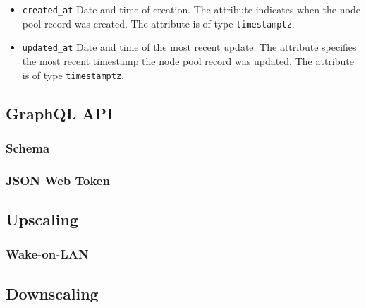 \begin{itemize}
  \item \texttt{created\_at}
    \newline
    Date and time of creation.
    \newline
    The attribute indicates when the node pool record was created.
    \newline
    The attribute is of type \texttt{timestamptz}.

  \item \texttt{updated\_at}
    \newline
    Date and time of the most recent update.
    \newline
    The attribute specifies the most recent timestamp the node pool record was updated.
    \newline
    The attribute is of type \texttt{timestamptz}.
\end{itemize}

\subsection{GraphQL API}
\label{subsec:implementation_server_graphql}

\subsubsection{Schema}
\label{subsubsec:implementation_server_graphql_schema}

\subsubsection{JSON Web Token}
\label{subsubsec:implementation_server_graphql_json_web_token}

\subsection{Upscaling}
\label{subsec:implementation_server_upscaling}

\subsubsection{Wake-on-LAN}
\label{subsubsec:implementation_server_scale_up_wake_on_lan}

\subsection{Downscaling}
\label{subsec:implementation_server_downscaling}

